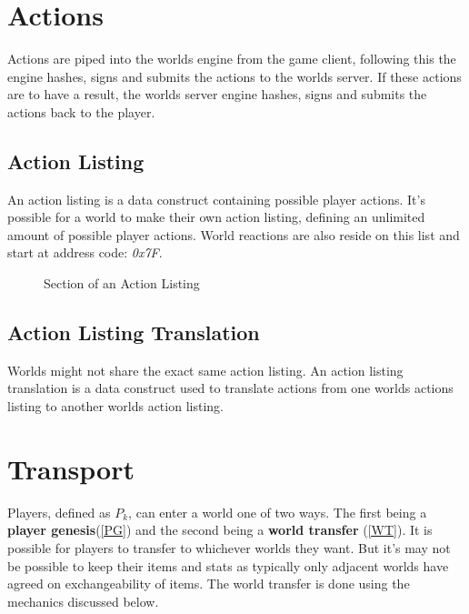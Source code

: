 \documentclass[runningheads,a4paper]{llncs}
\begin{document}

\section{Actions}
Actions are piped into the worlds engine from the game client, following this the engine hashes, signs and submits the actions to the worlds server. If these actions are to have a result, the worlds server engine hashes, signs and submits the actions back to the player.

\subsection{Action Listing}
An action listing is a data construct containing possible player actions. It's possible for a world to make their own action listing, defining an unlimited amount of possible player actions. World reactions are also reside on this list and start at address code: \textit{0x7F}. 

\begin{figure}
\caption{Section of an Action Listing}
\label{CodeAL}

\end{figure}

\subsection{Action Listing Translation}
Worlds might not share the exact same action listing. An action listing translation is a data construct used to translate actions from one worlds actions listing to another worlds action listing.


\section{Transport}
Players, defined as $P_k$, can enter a world one of two ways. The first being a \textbf{player genesis}(\ref{PG}) and the second being a \textbf{world transfer} (\ref{WT}). It is possible for players to transfer to whichever worlds they want. But it's may not be possible to keep their items and stats as typically only adjacent worlds have agreed on exchangeability of items. The world transfer is done using the mechanics discussed below.
\end{document}
